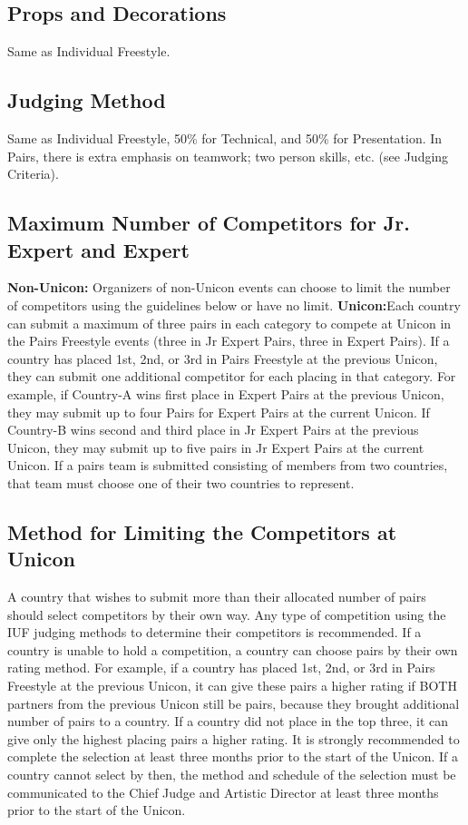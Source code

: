 \subsection{Props and Decorations}
Same as Individual Freestyle.

\subsection{Judging Method}
Same as Individual Freestyle, 50\% for Technical, and 50\% for Presentation.
In Pairs, there is extra emphasis on teamwork; two person skills, etc.
(see Judging Criteria).

\subsection{Maximum Number of Competitors for Jr. Expert and Expert}
\textbf{Non-Unicon:} Organizers of non-Unicon events can choose to limit the number of competitors using the guidelines below or have no limit. 
\textbf{Unicon:}Each country can submit a maximum of three pairs in each category to compete at Unicon in the Pairs Freestyle events (three in Jr Expert Pairs, three in Expert Pairs).
If a country has placed 1st, 2nd, or 3rd in Pairs Freestyle at the previous Unicon, they can submit one additional competitor for each placing in that category.
For example, if Country-A wins first place in Expert Pairs at the previous Unicon, they may submit up to four Pairs for Expert Pairs at the current Unicon.
If Country-B wins second and third place in Jr Expert Pairs at the previous Unicon, they may submit up to five pairs in Jr Expert Pairs at the current Unicon.
If a pairs team is submitted consisting of members from two countries, that team must choose one of their two countries to represent.

\subsection{Method for Limiting the Competitors at Unicon}
A country that wishes to submit more than their allocated number of pairs should select competitors by their own way.
Any type of competition using the IUF judging methods to determine their competitors is recommended.
If a country is unable to hold a competition, a country can choose pairs by their own rating method.
For example, if a country has placed 1st, 2nd, or 3rd in Pairs Freestyle at the previous Unicon, it can give these pairs a higher rating if BOTH partners from the previous Unicon still be pairs, because they brought additional number of pairs to a country.
If a country did not place in the top three, it can give only the highest placing pairs a higher rating.
It is strongly recommended to complete the selection at least three months prior to the start of the Unicon.
If a country cannot select by then, the method and schedule of the selection must be communicated to the Chief Judge and Artistic Director at least three months prior to the start of the Unicon.


